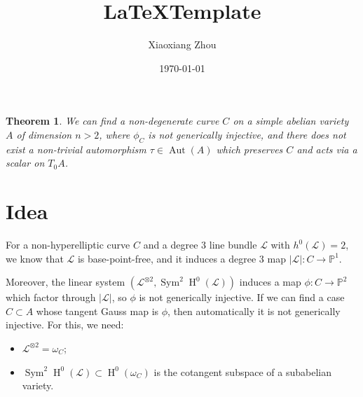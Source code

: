 \documentclass[UTF8]{amsart}
\numberwithin{equation}{section}
\theoremstyle{plain}
\newtheorem{theorem}{Theorem}[section]
\numberwithin{equation}{section}
\theoremstyle{remark}
\DeclareMathOperator{\Aut}{\operatorname{Aut}}
\DeclareMathOperator{\Sym}{\operatorname{Sym}}
\DeclareMathOperator{\Hnm}{\operatorname{H}}
\begin{document}
\date{\today}

\title
{\LaTeX\;Template
}
\author{Xiaoxiang Zhou}
\address{Institut für Mathematik\\
Humboldt-Universität zu Berlin\\
Berlin, 12489\\ Germany\\} 


\maketitle
\tableofcontents

\begin{theorem}
We can find a non-degenerate curve $C$ on a simple abelian variety $A$ of dimension $n>2$, where $\phi_C$ is not generically injective, and there does not exist a non-trivial automorphism $\tau \in \Aut(A)$ which preserves $C$ and acts via a scalar on $T_0A$.
\end{theorem}
\section{Idea}

For a non-hyperelliptic curve $C$ and a degree $3$ line bundle $\mathcal{L}$ with $
h^0(\mathcal{L})=2$, we know that $\mathcal{L}$ is base-point-free, and it induces a degree $3$ map $|\mathcal{L}|: C \longrightarrow \mathbb{P}^1$.

Moreover, the linear system $\left(\mathcal{L}^{\otimes 2}, \Sym^2 \Hnm^0(\mathcal{L})\right)$ induces a map $\phi:C \longrightarrow \mathbb{P}^2$ which factor through $|\mathcal{L}|$, so $\phi$ is not generically injective.  If we can find a case $C \subset A$ whose tangent Gauss map is $\phi$, then automatically it is not generically injective. For this, we need:

\begin{itemize}
\item $\mathcal{L}^{\otimes 2}= \omega_C$;
\item $\Sym^2 \Hnm^0(\mathcal{L}) \subset \Hnm^0(\omega_C)$ is the cotangent subspace of a subabelian variety.
\end{itemize}
\end{document}
